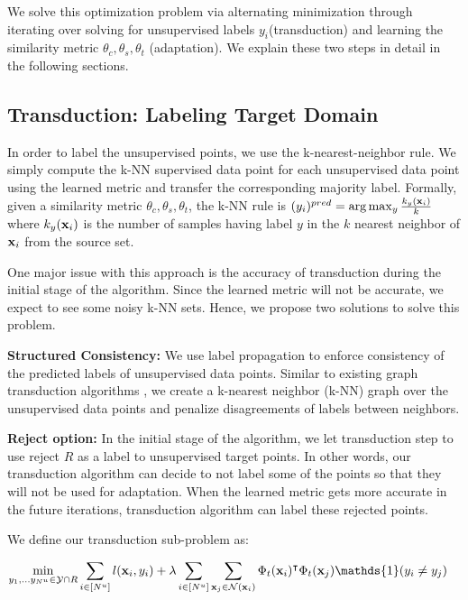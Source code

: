 We solve this optimization problem via alternating minimization through iterating over solving for unsupervised labels $y_i$(transduction) and learning the similarity metric $\theta_c,\theta_s,\theta_t$ (adaptation). We explain these two steps in detail in the following sections.







\subsection{Transduction: Labeling Target Domain}
\label{label}
In order to label the unsupervised points, we use the k-nearest-neighbor rule. We simply compute the k-NN supervised data point for each unsupervised data point using the learned metric and transfer the corresponding majority label. Formally, given a similarity metric $\theta_c, \theta_s, \theta_t$, the k-NN rule is 
$(y_i)^{pred} = \arg\max_y \frac{k_y(\mathbf{x}_i)}{k}$ where $k_y(\mathbf{x}_i)$ is the number of samples having label $y$ in the $k$ nearest neighbor of $\mathbf{x}_i$ from the source set. 

One major issue with this approach is the accuracy of transduction during the initial stage of the algorithm. Since the learned metric will not be accurate, we expect to see some noisy k-NN sets. Hence, we propose two solutions to solve this problem.

\textbf{Structured Consistency:} We use label propagation to enforce consistency of the predicted labels of unsupervised data points. Similar to existing graph transduction algorithms \cite{label_prop1,label_prop2}, we create a k-nearest neighbor (k-NN) graph over the unsupervised data points and penalize disagreements of labels between neighbors.

\textbf{Reject option:} In the initial stage of the algorithm, we let transduction step to use reject $R$ as a label to unsupervised target points. In other words, our transduction algorithm can decide to not label some of the points so that they will not be used for adaptation. When the learned metric gets more accurate in the future iterations, transduction algorithm can label these rejected points.

We define our transduction sub-problem as:

\begin{equation}
\begin{aligned}
\min_{y_1, \ldots y_{N^u} \in \mathcal{Y} \cap R}  &\sum_{i \in [N^u]} l(\xui, y_i) + \lambda \sum_{i \in [N^u]} \sum_{\xuj \in \mathcal{N}(\xui)} \Phi_t(\xui)^\intercal \Phi_t(\xuj)\mathds{1}(y_i \neq y_j)
\end{aligned}
\label{robtran}
\end{equation}

